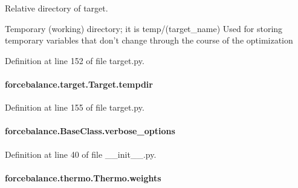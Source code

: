 Relative directory of target. 

Temporary (working) directory; it is temp/(target\-\_\-name) Used for storing temporary variables that don't change through the course of the optimization 

Definition at line 152 of file target.\-py.

\hypertarget{classforcebalance_1_1target_1_1Target_aa1f01b5b78db253b5b66384ed11ed193}{
\paragraph[{tempdir}]{\setlength{\rightskip}{0pt plus 5cm}forcebalance.\-target.\-Target.\-tempdir\hspace{0.3cm}{\ttfamily [inherited]}}}\label{classforcebalance_1_1target_1_1Target_aa1f01b5b78db253b5b66384ed11ed193}


Definition at line 155 of file target.\-py.

\hypertarget{classforcebalance_1_1BaseClass_afd68efa29ccd2f320f4cf82198214aac}{
\paragraph[{verbose\-\_\-options}]{\setlength{\rightskip}{0pt plus 5cm}forcebalance.\-Base\-Class.\-verbose\-\_\-options\hspace{0.3cm}{\ttfamily [inherited]}}}\label{classforcebalance_1_1BaseClass_afd68efa29ccd2f320f4cf82198214aac}


Definition at line 40 of file \-\_\-\-\_\-init\-\_\-\-\_\-.\-py.

\hypertarget{classforcebalance_1_1thermo_1_1Thermo_a2821e61578dac23a40db4788abacda0f}{
\paragraph[{weights}]{\setlength{\rightskip}{0pt plus 5cm}forcebalance.\-thermo.\-Thermo.\-weights\hspace{0.3cm}{\ttfamily [inherited]}}}\label{classforcebalance_1_1thermo_1_1Thermo_a2821e61578dac23a40db4788abacda0f}


